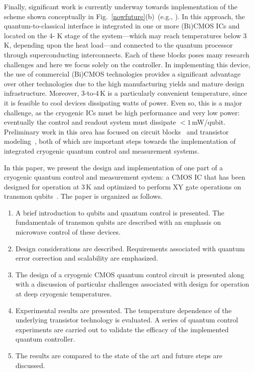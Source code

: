 \documentclass[journal]{IEEEtran}
\newcommand{\CR}[1]{{\color{black}#1}}
\begin{document}
Finally, significant work is currently underway towards implementation of the scheme shown conceptually in Fig.~\ref{nowfuture}(b)~(e.g., \cite{mehrpoo2019benefits,CharbonISSCC}). In this approach, the quantum-to-classical interface is integrated in one or more (Bi)CMOS ICs and located on the 4-
K stage of the system\CR{---which may reach temperatures below 3\,K, depending upon the heat load---and connected to the quantum processor through superconducting interconnects. Each of these blocks poses many research challenges and here we focus solely on the controller}.  \CR{In implementing this device, the} use of commercial (Bi)CMOS technologies provides a significant advantage \CR{over other technologies} due to the high manufacturing yields and mature design infrastructure. Moreover, 3-to-4\,K is a particularly convenient temperature, since it is feasible to cool devices dissipating watts of power. Even so, this is a major challenge, as the cryo\CR{genic} ICs must be high performance and very low power\CR{: eventually the control and readout system must dissipate} $<1$\,mW/qubit.  Preliminary work in this area has focused on circuit blocks~\cite{charbonISSCCexpanded,homulle2018deep,sorin} and transistor modeling~\cite{charbonISSCCexpanded,incandela2018characterization,beckers2018characterization}, both of which are important steps towards the implementation of integrated cryogenic quantum control and measurement systems.

 

In this paper, we present the design and implementation of one part of a cryogenic quantum control and measurement system: a CMOS IC that has been designed for operation at \CR{3\,K} and optimized to perform XY gate operations on transmon qubits~\cite{bardinISSCC}.
The paper is organized as follows.
\begin{enumerate}
\item{A brief introduction to qubits and quantum control is presented. The fundamentals of transmon qubits are described with an emphasis on microwave control of these devices.}
\item{Design considerations are described. Requirements associated with quantum error correction and scalability are emphasized.}
\item{The design of a cryogenic CMOS quantum control circuit is presented along with a discussion of particular challenges associated with design for operation at deep cryogenic temperatures.}
\item{Experimental results are presented. The temperature dependence of the underlying transistor technology is evaluated. A series of quantum control experiments are carried out to validate the efficacy of the implemented quantum controller.}
\item{The results are compared to the state of the art and future steps are discussed.}
\end{enumerate}
\end{document}
